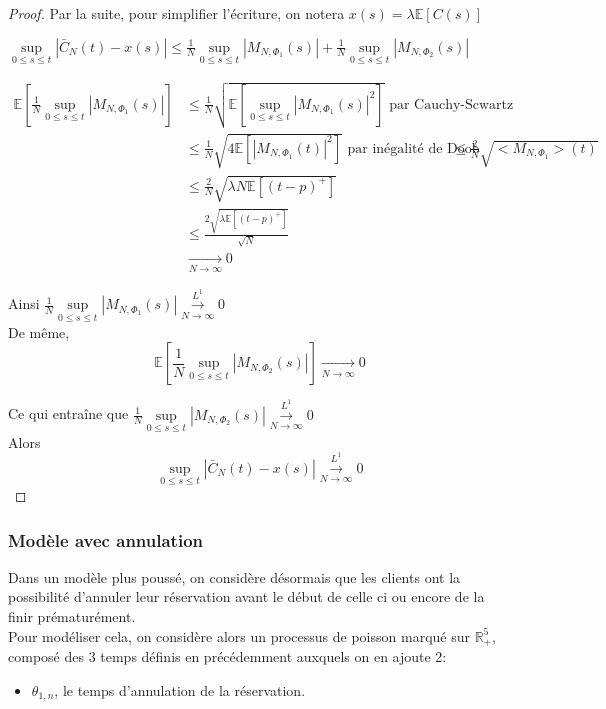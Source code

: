 \documentclass[12pt,a4paper]{article}
\newcommand{\E}[1]{\mathbb{E}\left[ #1 \right]}
\newcommand{\R}{\mathbb{R}}
\newcommand{\1}[1]{\mathbbm{1}_{\{#1\}} }
\theoremstyle{definition}
\begin{document}
{\begin{proof}
Par la suite, pour simplifier l'écriture, on notera $x(s) = \lambda \E{C(s)}$

$\underset{0\leq s \leq t}{\sup} |\bar{C}_N(t)-x(s)| \leq \frac{1}{N}\underset{0\leq s \leq t}{\sup} |M_{N,\Phi_1}(s)| + \frac{1}{N}\underset{0\leq s \leq t}{\sup} |M_{N,\Phi_2}(s)| $

\begin{align*}
\E{\frac{1}{N}\underset{0\leq s \leq t}{\sup} |M_{N,\Phi_1}(s)|} &\leq \frac{1}{N}\sqrt{\E{\underset{0\leq s \leq t}{\sup} |M_{N,\Phi_1}(s)|^2}} \text{ par Cauchy-Scwartz}\\
& \leq \frac{1}{N}\sqrt{4 \E{|M_{N,\Phi_1}(t)|^2}}  \text{ par inégalité de Doob}
& \leq \frac{2}{N}\sqrt{<M_{N,\Phi_1}>(t)}\\
&\leq \frac{2}{N}\sqrt{ \lambda N \E{(t-p)^+}}\\
&\leq \frac{2\sqrt{ \lambda \E{(t-p)^+}}}{\sqrt{N}}\\
& \underset{N \to \infty}{\to} 0
\end{align*}


Ainsi $\frac{1}{N}\underset{0\leq s \leq t}{\sup} |M_{N,\Phi_1}(s)|\overset{L^1}{\underset{N \to \infty}{\to}} 0$\\
 
De même, $$\E{\frac{1}{N}\underset{0\leq s \leq t}{\sup} |M_{N,\Phi_2}(s)|} \underset{N \to \infty}{\to} 0$$

Ce qui entraîne que $\frac{1}{N}\underset{0\leq s \leq t}{\sup} |M_{N,\Phi_2}(s)|\overset{L^1}{\underset{N \to \infty}{\to}} 0$\\


Alors $$ \underset{0\leq s \leq t}{\sup} |\bar{C}_N(t)-x(s)|\overset{L^1}{\underset{N \to \infty}{\to}} 0$$


\end{proof}

\subsubsection{Modèle avec annulation}

Dans un modèle plus poussé, on considère désormais que les clients ont la possibilité d'annuler leur réservation avant le début de celle ci ou encore de la finir prématurément.\\

Pour modéliser cela, on considère alors un processus de poisson marqué sur $\R_+^5$, composé des 3 temps définis en précédemment auxquels on en ajoute 2:
\begin{itemize}
\item $\theta_{1,n}$, le temps d'annulation de la réservation.


\end{itemize}}
\end{document}
